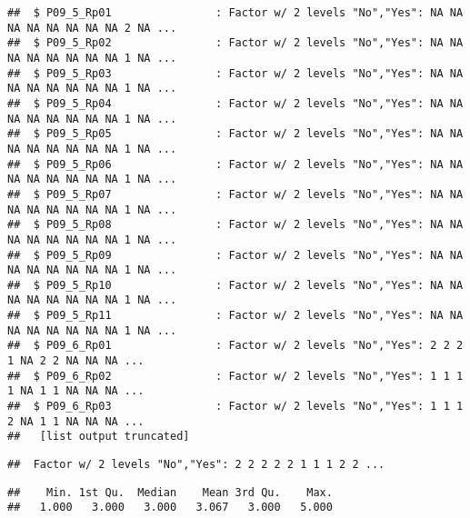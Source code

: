 \documentclass[
]{article}
\newenvironment{Shaded}{\begin{snugshade}}{\end{snugshade}}
\newcommand{\FunctionTok}[1]{\textcolor[rgb]{0.13,0.29,0.53}{\textbf{#1}}}
\newcommand{\NormalTok}[1]{#1}
\newcommand{\SpecialCharTok}[1]{\textcolor[rgb]{0.81,0.36,0.00}{\textbf{#1}}}
\begin{document}
\begin{verbatim}
##  $ P09_5_Rp01                : Factor w/ 2 levels "No","Yes": NA NA NA NA NA NA NA NA 2 NA ...
##  $ P09_5_Rp02                : Factor w/ 2 levels "No","Yes": NA NA NA NA NA NA NA NA 1 NA ...
##  $ P09_5_Rp03                : Factor w/ 2 levels "No","Yes": NA NA NA NA NA NA NA NA 1 NA ...
##  $ P09_5_Rp04                : Factor w/ 2 levels "No","Yes": NA NA NA NA NA NA NA NA 1 NA ...
##  $ P09_5_Rp05                : Factor w/ 2 levels "No","Yes": NA NA NA NA NA NA NA NA 1 NA ...
##  $ P09_5_Rp06                : Factor w/ 2 levels "No","Yes": NA NA NA NA NA NA NA NA 1 NA ...
##  $ P09_5_Rp07                : Factor w/ 2 levels "No","Yes": NA NA NA NA NA NA NA NA 1 NA ...
##  $ P09_5_Rp08                : Factor w/ 2 levels "No","Yes": NA NA NA NA NA NA NA NA 1 NA ...
##  $ P09_5_Rp09                : Factor w/ 2 levels "No","Yes": NA NA NA NA NA NA NA NA 1 NA ...
##  $ P09_5_Rp10                : Factor w/ 2 levels "No","Yes": NA NA NA NA NA NA NA NA 1 NA ...
##  $ P09_5_Rp11                : Factor w/ 2 levels "No","Yes": NA NA NA NA NA NA NA NA 1 NA ...
##  $ P09_6_Rp01                : Factor w/ 2 levels "No","Yes": 2 2 2 1 NA 2 2 NA NA NA ...
##  $ P09_6_Rp02                : Factor w/ 2 levels "No","Yes": 1 1 1 1 NA 1 1 NA NA NA ...
##  $ P09_6_Rp03                : Factor w/ 2 levels "No","Yes": 1 1 1 2 NA 1 1 NA NA NA ...
##   [list output truncated]
\end{verbatim}

\begin{Shaded}
\end{Shaded}

\begin{verbatim}
##  Factor w/ 2 levels "No","Yes": 2 2 2 2 2 1 1 1 2 2 ...
\end{verbatim}

\begin{Shaded}
\end{Shaded}

\begin{verbatim}
##    Min. 1st Qu.  Median    Mean 3rd Qu.    Max. 
##   1.000   3.000   3.000   3.067   3.000   5.000
\end{verbatim}
\end{document}
